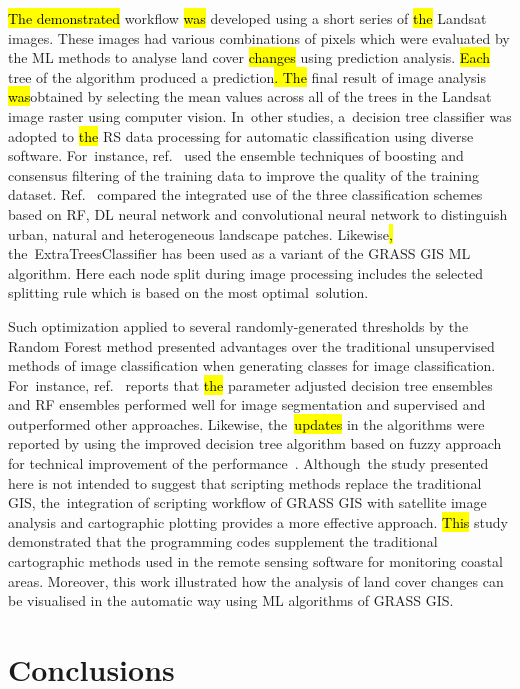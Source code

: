\documentclass[coasts,article,accept,pdftex,oneauthor]{Definitions/mdpi}
\begin{document}
\hl{The demonstrated} workflow \hl{was} developed using a short series of \hl{the }Landsat images. These images had various combinations of pixels which were evaluated by the ML\hl{ }methods to analyse\hl{ }land cover \hl{changes }using prediction analysis. \hl{Each} tree of the algorithm produced a prediction\hl{. The} final result of image analysis \hl{was}obtained by selecting the mean values across all of the trees in the Landsat image raster using computer vision. In~other studies, a~decision tree classifier was adopted to \hl{the} RS data processing for automatic classification using diverse software. For~instance, ref.~\cite{BROWNDECOLSTOUN2003316} used the ensemble techniques of boosting and consensus filtering of the training data to improve the quality of the training dataset. Ref.~\cite{VAIDYA2024101770} compared the integrated use of the three classification schemes based on RF, DL neural network and convolutional neural network to distinguish urban, natural and heterogeneous landscape patches. Likewise\hl{,} the~ExtraTreesClassifier has been used as a\hl{ }variant of the GRASS GIS ML algorithm. Here each node split during\hl{ }image processing includes the selected splitting rule which is based on the most optimal~solution. 

Such optimization {applied to} several randomly-generated thresholds by the Random Forest method {presented} advantages over the traditional unsupervised methods of image classification when generating classes for image classification. For~instance, ref.~\cite{PASQUARELLA2023103561} reports that \hl{the} parameter adjusted decision tree ensembles and {RF} ensembles performed well for image segmentation and supervised and outperformed other approaches. Likewise, the~\hl{updates} in the algorithms were reported by using {the }improved decision tree algorithm based on{ }fuzzy approach\hl{ }for technical improvement of the\hl{ }performance~\cite{ALOBEIDAT20151192}. Although~the study presented here is not intended to suggest that scripting methods replace the traditional GIS, the~integration of scripting workflow of GRASS GIS with satellite image analysis\hl{ }and cartographic plotting provides a more effective approach. \hl{This} study demonstrated that the programming codes\hl{ }supplement the traditional cartographic methods used in the remote sensing software for monitoring coastal areas. Moreover, this work illustrated how the analysis of land cover changes can be visualised in the automatic way using ML algorithms of GRASS GIS. 
\section{Conclusions}
\end{document}
